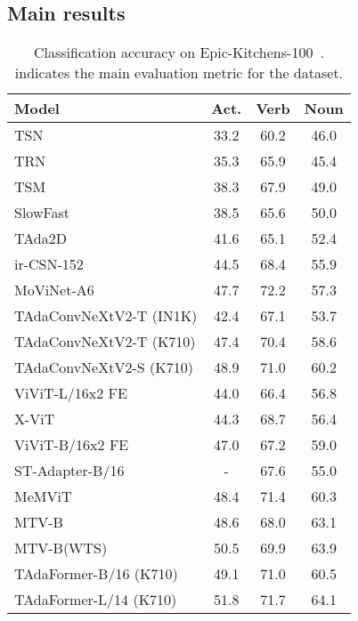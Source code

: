 \documentclass[10pt,journal,compsoc]{IEEEtran}
\newcommand{\vb}{{\color{vit}{\,}}}
\newcommand{\cb}{{\color{convnet}{\,}}}
\newcommand{\tablestyle}[2]{\setlength{\tabcolsep}{#1}\renewcommand{\arraystretch}{#2}\centering\small}
\newcommand\graycell[0]{\cellcolor{midgrey}}
\begin{document}
\subsection{Main results}
\begin{table}[t]
\caption{
Classification accuracy on Epic-Kitchens-100~\cite{ek100}.  indicates the main evaluation metric for the dataset.}
\centering
\tablestyle{5.5pt}{1.0}
\begin{tabular}{lccc}
\toprule
\bf Model & \textbf{Act.} & Verb & Noun \\
\midrule
\cb TSN~\cite{tsn} & 33.2 & 60.2 & 46.0 \\
\cb TRN~\cite{trn} & 35.3 & 65.9 & 45.4 \\ 
\cb TSM~\cite{tsm} & 38.3 & 67.9 & 49.0 \\
\cb SlowFast~\cite{slowfast} & 38.5 & 65.6 & 50.0 \\
\cb TAda2D~\cite{huangtada} & 41.6 & 65.1 & 52.4\\
\cb ir-CSN-152~\cite{vivitek100} & 44.5 & 68.4 & 55.9 \\
\cb MoViNet-A6~\cite{kondratyuk2021movinets} & 47.7 & 72.2 & 57.3 \\
\cb\graycell TAdaConvNeXtV2-T {\footnotesize(IN1K)} &\graycell 42.4 &\graycell 67.1 &\graycell 53.7 \\
\cb\graycell TAdaConvNeXtV2-T {\footnotesize(K710)} &\graycell 47.4 &\graycell 70.4 &\graycell 58.6 \\
\cb\graycell TAdaConvNeXtV2-S {\footnotesize(K710)} &\graycell 48.9 &\graycell 71.0 &\graycell 60.2 \\
\midrule
\vb ViViT-L/16x2 FE~\cite{arnab2021vivit} & 44.0 & 66.4 & 56.8 \\
\vb X-ViT~\cite{bulat2021xvit} & 44.3 & 68.7 & 56.4 \\
\vb ViViT-B/16x2 FE {\scriptsize}~\cite{vivitek100} & 47.0 & 67.2 & 59.0 \\
\vb ST-Adapter-B/16~\cite{pan2022stadapter} & - & 67.6 & 55.0 \\
\vb MeMViT~\cite{wu2022memvit} & 48.4 & 71.4 & 60.3 \\
\vb MTV-B{\scriptsize}~\cite{yan2022multiview} & 48.6 & 68.0 & 63.1 \\
\vb MTV-B{\footnotesize(WTS)}{\scriptsize}~\cite{yan2022multiview} & 50.5 & 69.9 & 63.9 \\
\graycell\vb TAdaFormer-B/16 {\footnotesize(K710)} & \graycell49.1 & \graycell71.0 & \graycell60.5 \\
\graycell\vb TAdaFormer-L/14 {\footnotesize(K710)} & \graycell51.8 & \graycell71.7 & \graycell64.1 \\
\bottomrule
\end{tabular}
\label{tab:main-ek100}
\end{table}
\end{document}
